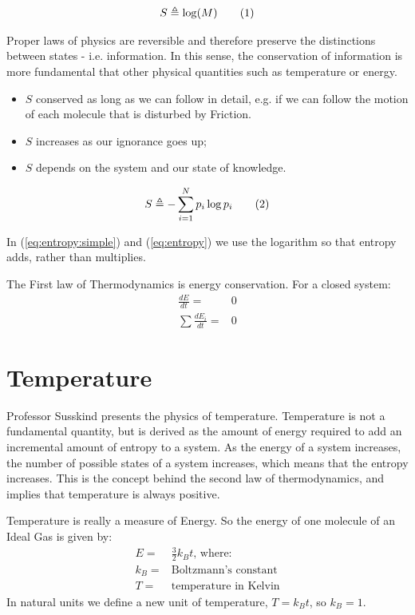 \documentclass[]{article}
\newcommand\numberthis{\addtocounter{equation}{1}\tag{\theequation}}
\begin{document}
\begin{align*}
S \triangleq \log(M) \numberthis \label{eq:entropy:simple}
\end{align*}

Proper laws of physics are reversible and therefore preserve the distinctions between states - i.e. information.  In this sense, the conservation of information is more fundamental that other physical quantities such as temperature or energy.  
\begin{itemize}
	\item $S$ conserved as long as we can follow in detail, e.g. if we can follow the motion of each molecule that is disturbed by Friction.
	\item $S$ increases as our ignorance goes up;
	\item $S$ depends on the system and our state of knowledge.
\end{itemize}

\begin{align*}
S \triangleq - \sum_{i=1}^{N} p_i \log{p_i} \numberthis \label{eq:entropy}
\end{align*}


In (\ref{eq:entropy:simple}) and (\ref{eq:entropy}) we use the logarithm so that entropy adds, rather than multiplies.

The First law of Thermodynamics is energy conservation. For a closed system:
\begin{align*}
\frac{dE}{dt} =& 0\\
\sum \frac{dE_i}{dt} =& 0
\end{align*}


\section{Temperature}

Professor Susskind presents the physics of temperature. Temperature is not a fundamental quantity, but is derived as the amount of energy required to add an incremental amount of entropy to a system.  As the energy of a system increases, the number of possible states of a system increases, which means that the entropy increases.  This is the concept behind the second law of thermodynamics, and implies that temperature is always positive.

Temperature is really a measure of Energy. So the energy of one molecule of an Ideal Gas is given by:
\begin{align*}
E =& \frac{3}{2} k_B t\text{, where:}\\
k_B =& \text{Boltzmann's constant}\\
T =& \text{temperature in Kelvin}
\end{align*}
 In natural units we define a new unit of temperature, $T=k_Bt$, so $k_B=1$.
 
\end{document}

